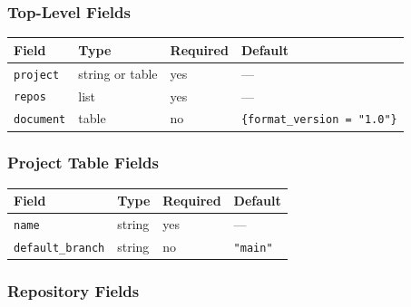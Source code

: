 \subsubsection{Top-Level Fields}

\begin{center}
\begin{tabular}{llll}
\textbf{Field} & \textbf{Type} & \textbf{Required} & \textbf{Default} \\ \hline
\texttt{project} & string or table & yes & — \\
\texttt{repos} & list & yes & — \\
\texttt{document} & table & no & \texttt{\{format\_version = "1.0"\}} \\
\end{tabular}
\end{center}

\subsubsection{Project Table Fields}

\begin{center}
\begin{tabular}{llll}
\textbf{Field} & \textbf{Type} & \textbf{Required} & \textbf{Default} \\ \hline
\texttt{name} & string & yes & — \\
\texttt{default\_branch} & string & no & \texttt{"main"} \\
\end{tabular}
\end{center}

\subsubsection{Repository Fields}

